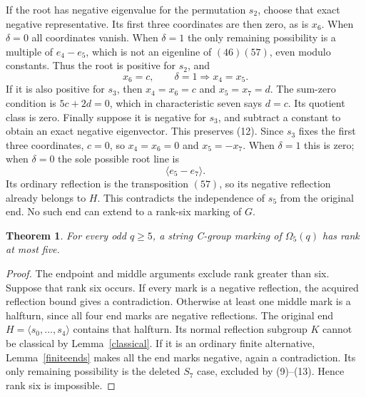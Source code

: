 \documentclass[11pt,a4paper]{article}
\newtheorem{theorem}{Theorem}\newtheorem{lemma}[theorem]{Lemma}
\newcommand{\gen}[1]{\langle#1\rangle}\newcommand{\Om}{\Omega}
\begin{document}
If the root has negative eigenvalue for the permutation $s_2$, choose
that exact negative representative. Its first three coordinates are
then zero, as is $x_6$. When $\delta=0$ all coordinates vanish.
When $\delta=1$ the only remaining possibility is a multiple of
$e_4-e_5$, which is not an eigenline of $(46)(57)$, even modulo
constants. Thus the root is positive for $s_2$, and
\[
                   x_6=c,\qquad \delta=1\Longrightarrow x_4=x_5.
                                                               \tag{12}
\]
If it is also positive for $s_3$, then $x_4=x_6=c$ and
$x_5=x_7=d$. The sum-zero condition is $5c+2d=0$, which in
characteristic seven says $d=c$. Its quotient class is zero.
Finally suppose it is negative for $s_3$, and subtract a constant
to obtain an exact negative eigenvector. This preserves (12).
Since $s_3$ fixes the first three coordinates, $c=0$, so
$x_4=x_6=0$ and $x_5=-x_7$. When $\delta=1$ this is zero;
when $\delta=0$ the sole possible root line is
\[
                         \gen{e_5-e_7}.                 \tag{13}
\]
Its ordinary reflection is the transposition $(57)$, so its negative
reflection already belongs to $H$. This contradicts the independence
of $s_5$ from the original end. No such end can extend to a rank-six
marking of $G$.

\begin{theorem}\label{main}
For every odd $q\ge5$, a string C-group marking of $\Om_5(q)$ has
rank at most five.
\end{theorem}
\begin{proof}
The endpoint and middle arguments exclude rank greater than six.
Suppose that rank six occurs. If every mark is a negative reflection,
the acquired reflection bound gives a contradiction. Otherwise at
least one middle mark is a halfturn, since all four end marks are
negative reflections. The original end $H=\gen{s_0,\ldots,s_4}$
contains that halfturn. Its normal reflection subgroup $K$ cannot
be classical by Lemma~\ref{classical}. If it is an ordinary finite
alternative, Lemma~\ref{finiteends} makes all the end marks negative,
again a contradiction. Its only remaining possibility is the deleted
$S_7$ case, excluded by (9)--(13). Hence rank six is impossible.
\end{proof}
\end{document}
